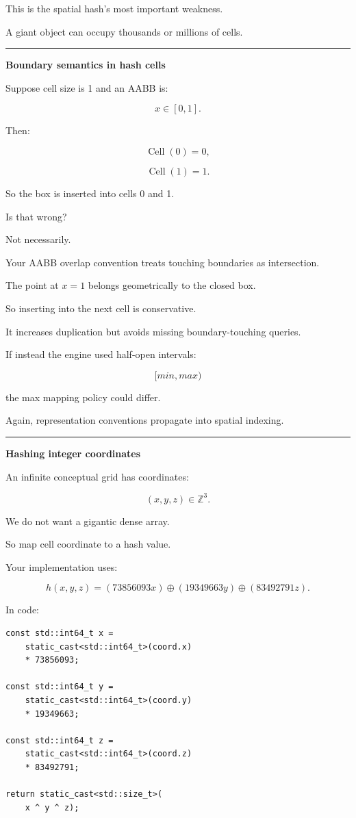 This is the spatial hash's most important weakness.

A giant object can occupy thousands or millions of cells.

\begin{center}\rule{0.5\linewidth}{0.5pt}\end{center}

\textbf{Boundary semantics in hash cells}

Suppose cell size is 1 and an AABB is:

\[
x\in[0,1].
\]

Then:

\[
\operatorname{Cell}(0)=0,
\]

\[
\operatorname{Cell}(1)=1.
\]

So the box is inserted into cells 0 and 1.

Is that wrong?

Not necessarily.

Your AABB overlap convention treats touching boundaries as intersection.

The point at \(x=1\) belongs geometrically to the closed box.

So inserting into the next cell is conservative.

It increases duplication but avoids missing boundary-touching queries.

If instead the engine used half-open intervals:

\[
[min,max)
\]

the max mapping policy could differ.

Again, representation conventions propagate into spatial indexing.

\begin{center}\rule{0.5\linewidth}{0.5pt}\end{center}

\textbf{Hashing integer coordinates}

An infinite conceptual grid has coordinates:

\[
(x,y,z)\in\mathbb Z^3.
\]

We do not want a gigantic dense array.

So map cell coordinate to a hash value.

Your implementation uses:

\[
h(x,y,z)
=
(73856093x)
\oplus
(19349663y)
\oplus
(83492791z).
\]

In code:

\begin{verbatim}
const std::int64_t x =
    static_cast<std::int64_t>(coord.x)
    * 73856093;

const std::int64_t y =
    static_cast<std::int64_t>(coord.y)
    * 19349663;

const std::int64_t z =
    static_cast<std::int64_t>(coord.z)
    * 83492791;

return static_cast<std::size_t>(
    x ^ y ^ z);
\end{verbatim}

